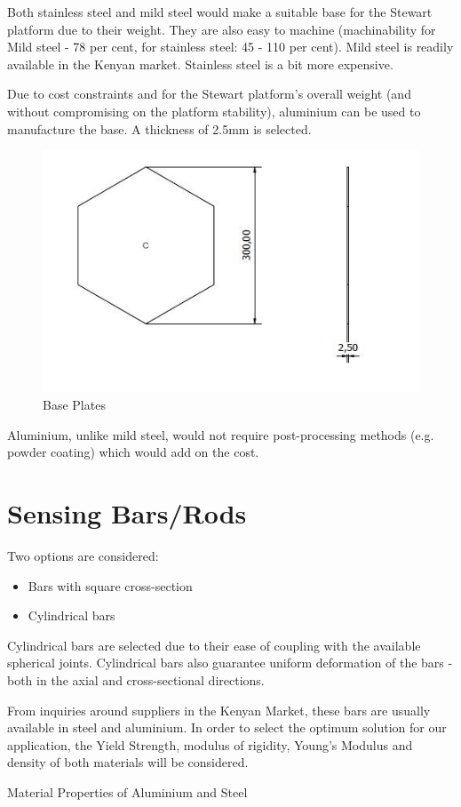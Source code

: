 Both stainless steel and mild steel would make a suitable base for the Stewart platform due to their weight. They are also easy to machine (machinability for Mild steel - 78 per cent, for stainless steel: 45 - 110 per cent). Mild steel is readily available in the Kenyan market. Stainless steel is a bit more expensive.

Due to cost constraints and for the Stewart platform's overall weight (and without compromising on the platform stability), aluminium can be used to manufacture the base. A thickness of 2.5mm is selected.
\begin{center}
	\begin{figure}[H]
	\centering
	\includegraphics[width=0.6\linewidth]{Figures/Base}
	\caption[Base Plates]{Base Plates}
	\end{figure}
\end{center}
Aluminium, unlike mild steel, would not require post-processing methods (e.g. powder coating) which would add on the cost.
\section{Sensing Bars/Rods}
Two options are considered:
\begin{itemize}
\item Bars with square cross-section
\item Cylindrical bars
\end{itemize}
Cylindrical bars are selected due to their ease of coupling with the available spherical joints. Cylindrical bars also guarantee uniform deformation of the bars - both in the axial and cross-sectional directions.

From inquiries around suppliers in the Kenyan Market, these bars are usually available in steel and aluminium. In order to select the optimum solution for our application, the Yield Strength, modulus of rigidity, Young's Modulus and density of both materials will be considered. 
\begin{table}[!h]
\caption[Aluminium and Steel Properties]{Material Properties of Aluminium and Steel}
\end{table}

